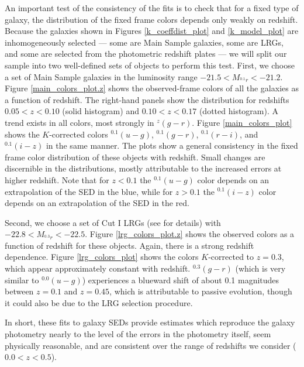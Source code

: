 \documentclass[10pt,preprint]{aastex}
\newcommand{\band}[2]{\ensuremath{^{#1}\!{#2}}}
\begin{document}
An important test of the consistency of the fits is to check that for
a fixed type of galaxy, the distribution of the fixed frame colors
depends only weakly on redshift. Because the galaxies shown in Figures
\ref{k_coeffdist_plot} and \ref{k_model_plot} are inhomogeneously
selected --- some are Main Sample galaxies, some are LRGs, and some
are selected from the photometric redshift plates --- we will split
our sample into two well-defined sets of objects to perform this
test. First, we choose a set of Main Sample galaxies in the luminosity
range $-21.5 < M_{\band{0.1}{r}} < -21.2$. Figure
\ref{main_colors_plot.z} shows the observed-frame colors of all the
galaxies as a function of redshift.  The right-hand panels show the
distribution for redshifts $0.05<z<0.10$ (solid histogram) and
$0.10<z<0.17$ (dotted histogram). A trend exists in all colors, most
strongly in $\band{z}{(g-r)}$. Figure \ref{main_colors_plot} shows the
$K$-corrected colors $\band{0.1}{(u-g)}$, $\band{0.1}{(g-r)}$,
$\band{0.1}{(r-i)}$, and $\band{0.1}{(i-z)}$ in the same manner.  The
plots show a general consistency in the fixed frame color distribution
of these objects with redshift.  Small changes are discernible in the
distributions, mostly attributable to the increased errors at higher
redshift. Note that for $z<0.1$ the $\band{0.1}{(u-g)}$ color depends
on an extrapolation of the SED in the blue, while for $z>0.1$ the
$\band{0.1}{(i-z)}$ color depends on an extrapolation of the SED in
the red.

Second, we choose a set of Cut I LRGs (see \citealt{eisenstein01a} for
details) with $-22.8 < M_{\band{0.3}{r}} < -22.5$. Figure
\ref{lrg_colors_plot.z} shows the observed colors as a function of
redshift for these objects. Again, there is a strong redshift
dependence. Figure \ref{lrg_colors_plot} shows the colors
$K$-corrected to $z=0.3$, which appear approximately constant with
redshift.
$\band{0.3}{(g-r)}$ (which is very similar to $\band{0.0}{(u-g)}$)
experiences a blueward shift of about 0.1 magnitudes between $z=0.1$
and $z=0.45$, which is attributable to passive evolution, though it
could also be due to the LRG selection procedure.

In short, these fits to galaxy SEDs provide estimates which reproduce
the galaxy photometry nearly to the level of the errors in the
photometry itself, seem physically reasonable, and are consistent over
the range of redshifts we consider ($0.0 < z < 0.5$). 
\end{document}
